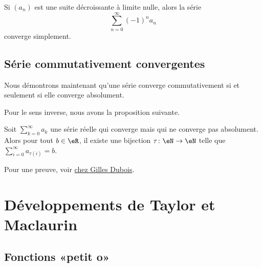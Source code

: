 \begin{corollary}       \label{CoreMjIfw}
    Si \( (a_n)\) est une suite décroissante à limite nulle, alors la série
  \begin{equation}
    \sum_{n=0}^\infty {(-1)}^n a_n
  \end{equation}
  converge simplement.
\end{corollary}

\subsection{Série commutativement convergentes}

Nous démontrons maintenant qu'une série converge commutativement si et seulement si elle converge absolument.

Pour le sens inverse, nous avons la proposition suivante.
\begin{proposition}
    Soit \( \sum_{k=0}^{\infty}a_k\) une série réelle qui converge mais qui ne converge pas absolument. Alors pour tout \( b\in \eR\), il existe une bijection \( \tau\colon \eN\to \eN\) telle que \( \sum_{i=0}^{\infty}a_{\tau(i)}=b\).
\end{proposition}
Pour une preuve, voir \href{http://gilles.dubois10.free.fr/analyse_reelle/seriescomconv.html}{chez Gilles Dubois}.

					\section{Développements de Taylor et Maclaurin}

\subsection{Fonctions «petit o» }

